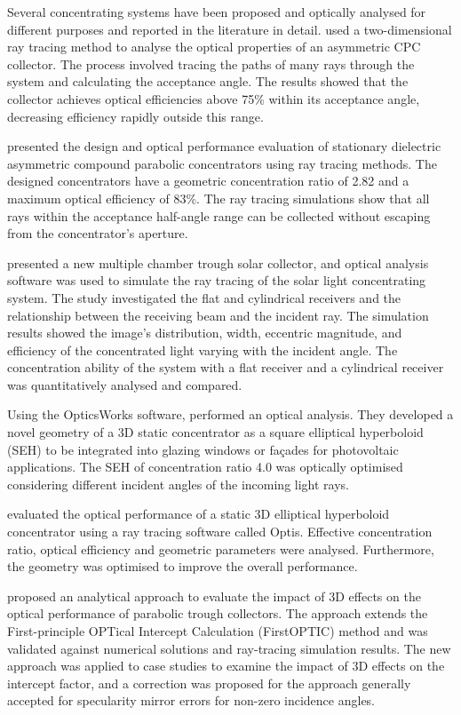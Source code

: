 Several concentrating systems have been proposed and optically analysed for different purposes and reported in the literature in detail. \citet{Souliotis2011} used a two-dimensional ray tracing method to analyse the optical properties of an asymmetric CPC collector. The process involved tracing the paths of many rays through the system and calculating the acceptance angle. The results showed that the collector achieves optical efficiencies above 75\% within its acceptance angle, decreasing efficiency rapidly outside this range.

\citet{Sarmah2011} presented the design and optical performance evaluation of stationary dielectric asymmetric compound parabolic concentrators using ray tracing methods. The designed concentrators have a geometric concentration ratio of 2.82 and a maximum optical efficiency of 83\%. The ray tracing simulations show that all rays within the acceptance half-angle range can be collected without escaping from the concentrator's aperture.

\citet{Zheng2011} presented a new multiple chamber trough solar collector, and optical analysis software was used to simulate the ray tracing of the solar light concentrating system. The study investigated the flat and cylindrical receivers and the relationship between the receiving beam and the incident ray. The simulation results showed the image's distribution, width, eccentric magnitude, and efficiency of the concentrated light varying with the incident angle. The concentration ability of the system with a flat receiver and a cylindrical receiver was quantitatively analysed and compared.

Using the OpticsWorks software, \citet{Sellami2012} performed an optical analysis. They developed a novel geometry of a 3D static concentrator as a square elliptical hyperboloid (SEH) to be integrated into glazing windows or fa\c{c}ades for photovoltaic applications. The SEH of concentration ratio 4.0 was optically optimised considering different incident angles of the incoming light rays.

\citet{Ali2013} evaluated the optical performance of a static 3D elliptical hyperboloid concentrator using a ray tracing software called Optis. Effective concentration ratio, optical efficiency and geometric parameters were analysed. Furthermore, the geometry was optimised to improve the overall performance.

\citet{Binotti2013} proposed an analytical approach to evaluate the impact of 3D effects on the optical performance of parabolic trough collectors. The approach extends the First-principle OPTical Intercept Calculation (FirstOPTIC) method and was validated against numerical solutions and ray-tracing simulation results. The new approach was applied to case studies to examine the impact of 3D effects on the intercept factor, and a correction was proposed for the approach generally accepted for specularity mirror errors for non-zero incidence angles.

